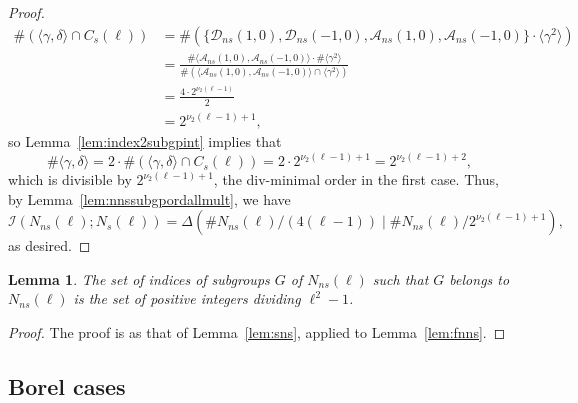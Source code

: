 \documentclass[table,dvipsnames]{amsart}
\newcommand{\I}{\mathcal{I}}
\newcommand{\angles}[1]{\langle #1\rangle}
\newtheorem{lemma}[theorem]{Lemma}
\numberwithin{equation}{section}
\newcommand{\s}{\textit{s}}
\newcommand{\ns}{\textit{ns}}
\newcommand{\Cs}{C_\s}
\newcommand{\Ns}{N_\s}
\newcommand{\Nns}{N_\ns}
\begin{document}
\begin{proof}
\begin{align*}
\#(\angles{\gamma,\delta}\cap\Cs(\ell))&=\#(\{\mathcal{D}_\ns(1,0),\mathcal{D}_\ns(-1,0),\mathcal{A}_\ns(1,0),\mathcal{A}_\ns(-1,0)\}\cdot\angles{\gamma^2})\\
&=\frac{\#\angles{\mathcal{A}_\ns(1,0),\mathcal{A}_\ns(-1,0)}\cdot\#\angles{\gamma^2}}{\#(\angles{\mathcal{A}_\ns(1,0),\mathcal{A}_\ns(-1,0)}\cap\angles{\gamma^2})}\\
&=\frac{4\cdot 2^{\nu_2(\ell-1)}}{2}\\
&=2^{\nu_2(\ell-1)+1},
\end{align*}
so Lemma~\ref{lem:index2subgpint} implies that
\begin{equation*}
\#\angles{\gamma,\delta}=2\cdot\#(\angles{\gamma,\delta}\cap\Cs(\ell))=2\cdot 2^{\nu_2(\ell-1)+1}=2^{\nu_2(\ell-1)+2},
\end{equation*}
which is divisible by $2^{\nu_2(\ell-1)+1}$, the div-minimal order in the first case. Thus, by Lemma~\ref{lem:nnssubgpordallmult}, we have
\begin{equation*}
\I(\Nns(\ell);\Ns(\ell))=\Delta(\#\Nns(\ell)/(4(\ell-1))\mid\#\Nns(\ell)/2^{\nu_2(\ell-1)+1}),
\end{equation*}
as desired.
\end{proof}

\begin{lemma}
\label{lem:nnns}
The set of indices of subgroups $G$ of $\Nns(\ell)$ such that $G$ belongs to $\Nns(\ell)$ is the set of positive integers dividing $\ell^2-1$.
\end{lemma}
\begin{proof}
The proof is as that of Lemma~\ref{lem:sns}, applied to Lemma~\ref{lem:fnns}.
\end{proof}

\subsection{Borel cases}
\label{subsec:b}
\end{document}
